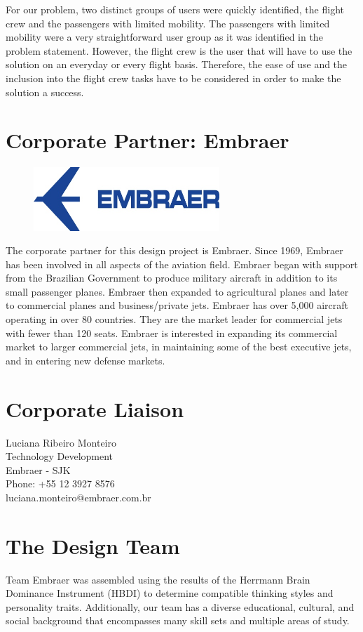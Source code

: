 \documentclass[a4paper, 12pt,conference]{new_cit_thesis}
\begin{document}
For our problem, two distinct groups of users were quickly identified, the flight crew and the passengers with limited mobility.   The passengers with limited mobility were a very straightforward user group as it was identified in the problem statement.  However, the flight crew is the user that will have to use the solution on an everyday or every flight basis.  Therefore, the ease of use and the inclusion into the flight crew tasks have to be considered in order to make the solution a success.

\section{Corporate Partner: Embraer}

\begin{figure}[h]
  \centering
     \includegraphics[width=7cm]{images/image010.jpg}
  \label{fig:10}
\end{figure}

The corporate partner for this design project is Embraer.  Since 1969, Embraer has been involved in all aspects of the aviation field.  Embraer began with support from the Brazilian Government to produce military aircraft in addition to its small passenger planes.  Embraer then expanded to agricultural planes and later to commercial planes and business/private jets.  Embraer has over 5,000 aircraft operating in over 80 countries.  They are the market leader for commercial jets with fewer than 120 seats.  Embraer is interested in expanding its commercial market to larger commercial jets, in maintaining some of the best executive jets, and in entering new defense markets.

\section*{Corporate Liaison}
Luciana Ribeiro Monteiro \\
  Technology Development \\
  Embraer - SJK \\
  Phone: +55 12 3927 8576 \\
  luciana.monteiro@embraer.com.br

\section{The Design Team}
Team Embraer was assembled using the results of the Herrmann Brain Dominance Instrument (HBDI) to determine compatible thinking styles and personality traits.  Additionally, our team has a diverse educational, cultural, and social background that encompasses many skill sets and multiple areas of study.
\end{document}

